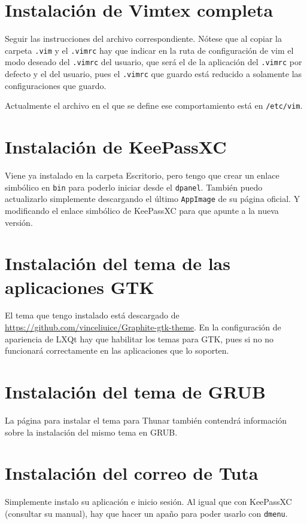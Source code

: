 \documentclass{article}
\begin{document}
    \section{Instalación de Vimtex completa}
    Seguir las instrucciones del archivo correspondiente. Nótese que al copiar
    la carpeta \texttt{.vim} y el \texttt{.vimrc} hay que indicar en la
    ruta de configuración de vim el modo deseado del \texttt{.vimrc} del
    usuario, que será el de la aplicación del \texttt{.vimrc} por defecto
    y el del usuario, pues el \texttt{.vimrc} que guardo está reducido a
    solamente las configuraciones que guardo.

    Actualmente el archivo en el que se define ese comportamiento está en
    \texttt{/etc/vim}.

    \section{Instalación de KeePassXC}
    Viene ya instalado en la carpeta Escritorio, pero tengo que crear un enlace
    simbólico en \texttt{bin} para poderlo iniciar desde el \texttt{dpanel}.
    También puedo actualizarlo simplemente descargando el último
    \texttt{AppImage} de su página oficial. Y modificando el enlace simbólico
    de KeePassXC para que apunte a la nueva versión.

    \section{Instalación del tema de las aplicaciones GTK}
    El tema que tengo instalado está descargado de
    \href{https://github.com/vinceliuice/Graphite-gtk-theme}
    {https://github.com/vinceliuice/Graphite-gtk-theme}. En la configuración de
    apariencia de LXQt hay que habilitar los temas para GTK, pues si no no
    funcionará correctamente en las aplicaciones que lo soporten.
    
    \section{Instalación del tema de GRUB}
    La página para instalar el tema para Thunar también contendrá información
    sobre la instalación del mismo tema en GRUB.

    \section{Instalación del correo de Tuta}
    Simplemente instalo su aplicación e inicio sesión. Al igual que con
    KeePassXC (consultar su manual), hay que hacer un apaño para poder
    usarlo con \texttt{dmenu}.
\end{document}
